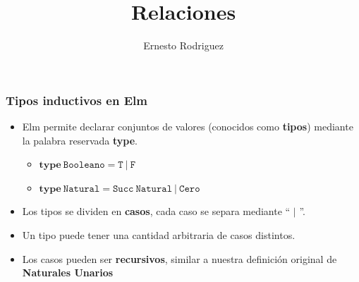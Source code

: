 \documentclass{beamer}
\title[Relaciones]{Relaciones}
\author{Ernesto Rodriguez}
\institute{
    Universidad del Itsmo \\
    \medskip \textit{erodriguez@unis.edu.gt}
}
\date[\today]{}
\begin{document}
\begin{frame}
    \maketitle
\end{frame}

\begin{frame}
\frametitle{Tipos inductivos en Elm}
\begin{itemize}
    \item{Elm permite declarar conjuntos de valores (conocidos
    como {\bf tipos}) mediante la palabra reservada {\bf type}.
    \begin{itemize}
        \item{$\mathbf{type}\ \mathtt{Booleano=T\ |\ F}$}
        \item{$\mathbf{type}\ \mathtt{Natural=Succ\ Natural\ |\ Cero}$}
    \end{itemize}
    }
    \item{Los tipos se dividen en {\bf casos}, cada caso se separa
    mediante `` $\vert$ ''.}
    \item{Un tipo puede tener una cantidad arbitraria de casos distintos.}
    \item{Los casos pueden ser {\bf recursivos}, similar a nuestra definici\'on
    original de {\bf Naturales Unarios}}
\end{itemize}
\end{frame}
\end{document}
